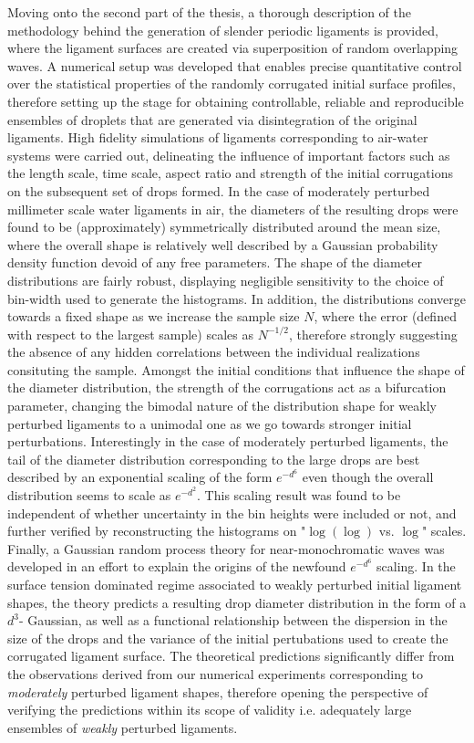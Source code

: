 Moving onto the second part of the thesis, a thorough description of the 
methodology behind the generation of slender periodic ligaments is provided, 
where the ligament surfaces are created via superposition of random overlapping waves.
A numerical setup was developed that enables precise quantitative control over the 
statistical properties of the randomly corrugated initial surface profiles, 
therefore setting up the stage for obtaining controllable, reliable and reproducible 
ensembles of droplets that are generated via disintegration of the original ligaments.
High fidelity simulations of ligaments corresponding to air-water systems were carried out,
delineating the influence of important factors such as the length scale, time scale, 
aspect ratio and strength of the initial corrugations on the subsequent set of drops formed.  
In the case of moderately perturbed millimeter scale water ligaments in air, 
the diameters of the resulting drops were found to be (approximately) symmetrically 
distributed around the mean size, where the overall shape is relatively well described by 
a Gaussian probability density function devoid of any free parameters.
The shape of the diameter distributions are fairly robust, displaying negligible sensitivity
to the choice of bin-width used to generate the histograms.
In addition, the distributions converge towards a fixed shape as we increase the sample size $N$, 
where the error (defined with respect to the largest sample) scales as $N^{-1/2}$, therefore strongly 
suggesting the absence of any hidden correlations between the individual realizations consituting the sample. 
Amongst the initial conditions that influence the shape of the diameter distribution, the strength of 
the corrugations act as a bifurcation parameter, changing the bimodal nature of the distribution shape for 
weakly perturbed ligaments to a unimodal one as we go towards stronger initial perturbations. 
Interestingly in the case of moderately perturbed ligaments, the tail of the diameter 
distribution corresponding to the large drops are best described by an exponential scaling of
the form $e^{-d^6}$ even though the overall distribution seems to scale as $e^{-d^2}$. 
This scaling result was found to be independent of whether uncertainty in the bin heights
were included or not, and further verified by reconstructing the histograms on "$\log(\log)$ vs. $\log$" scales.      
Finally, a Gaussian random process theory for near-monochromatic waves was developed 
in an effort to explain the origins of the newfound $e^{-d^6}$ scaling.
In the surface tension dominated regime associated to weakly perturbed initial ligament shapes, 
the theory predicts a resulting drop diameter distribution in the form of a $d^3$- Gaussian, 
as well as a functional relationship between the dispersion in the size of the drops and the 
variance of the initial pertubations used to create the corrugated ligament surface. 
The theoretical predictions significantly differ from the observations derived from our numerical experiments
corresponding to \textit{moderately} perturbed ligament shapes, therefore opening the perspective
of verifying the predictions within its scope of validity i.e. adequately large ensembles of \textit{weakly} perturbed ligaments.


    
